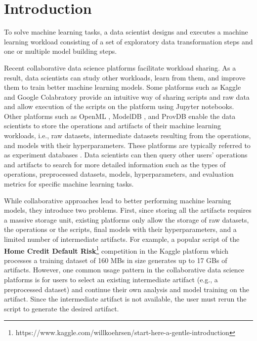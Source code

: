 \section{Introduction} \label{sec-introduction}
To solve machine learning tasks, a data scientist designs and executes a machine learning workload consisting of a set of exploratory data transformation steps and one or multiple model building steps.

Recent collaborative data science platforms facilitate workload sharing.
As a result, data scientists can study other workloads, learn from them, and improve them to train better machine learning models.
Some platforms such as Kaggle \cite{kagglewebsite} and Google Colabratory \cite{googlecolab} provide an intuitive way of sharing scripts and raw data and allow execution of the scripts on the platform using Jupyter notebooks. 
Other platforms such as OpenML \cite{vanschoren2014openml}, ModelDB \cite{vartak2016m}, and ProvDB \cite{miao2018provdb} enable the data scientists to store the operations and artifacts of their machine learning workloads, i.e., raw datasets, intermediate datasets resulting from the operations, and models with their hyperparameters.
These platforms are typically referred to as experiment databases \cite{Vanschoren2012}.
Data scientists can then query other users' operations and artifacts to search for more detailed information such as the types of operations, preprocessed datasets, models, hyperparameters, and evaluation metrics for specific machine learning tasks.

While collaborative approaches lead to better performing machine learning models, they introduce two problems.
First, since storing all the artifacts requires a massive storage unit, existing platforms only allow the storage of raw datasets, the operations or the scripts, final models with their hyperparameters, and a limited number of intermediate artifacts.
For example, a popular script of the \textbf{Home Credit Default Risk}\footnote{https://www.kaggle.com/willkoehrsen/start-here-a-gentle-introduction} competition in the Kaggle platform which processes a training dataset of 160 MBs in size generates up to 17 GBs of artifacts.
However, one common usage pattern in the collaborative data science platforms is for users to select an existing intermediate artifact (e.g., a preprocessed dataset) and continue their own analysis and model training on the artifact. 
Since the intermediate artifact is not available, the user must rerun the script to generate the desired artifact.

